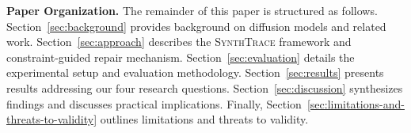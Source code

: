 \noindent\textbf{Paper Organization.}
The remainder of this paper is structured as follows.
Section~\ref{sec:background} provides background on diffusion models and related work.
Section~\ref{sec:approach} describes the \textsc{SynthTrace} framework and constraint-guided repair mechanism.
Section~\ref{sec:evaluation} details the experimental setup and evaluation methodology.
Section~\ref{sec:results} presents results addressing our four research questions.
Section~\ref{sec:discussion} synthesizes findings and discusses practical implications.
Finally, Section~\ref{sec:limitations-and-threats-to-validity} outlines limitations and threats to validity.






